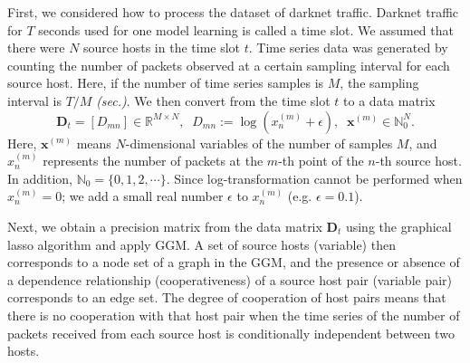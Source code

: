 \documentclass[conference]{IEEEtran}
\begin{document}
First, we considered how to process the dataset of darknet traffic.
Darknet traffic for $T$ seconds used for one model learning is called a time slot.
We assumed that there were $N$ source hosts in the time slot $t$.
Time series data was generated by counting the number of packets observed at a certain sampling interval for each source host.
Here, if the number of time series samples is $M$, the sampling interval is $T/M$ {\it (sec.)}.
We then convert from the time slot $t$ to a data matrix
\begin{equation*}
\bm{D}_t=[D_{mn}]\in\mathbb{R}^{M \times N},
\;\;D_{mn} := \log(x_n^{(m)}+\epsilon),
\;\;\bm{x}^{(m)}\in\mathbb{N}_0^{N}.
\end{equation*}
Here, $\bm{x}^{(m)}$ means $N$-dimensional variables of the number of samples $M$, and $x_n^{(m)}$ represents the number of packets at the $m$-th point of the $n$-th source host.
In addition, $\mathbb{N}_0=\{0,1,2,\cdots\}$.
Since log-transformation cannot be performed when $x_n^{(m)}=0$; we add a small real number $\epsilon$ to $x_n^{(m)}$ (e.g. $\epsilon=0.1$).

Next, we obtain a precision matrix from the data matrix $\bm{D}_t$ using the graphical lasso algorithm and apply GGM.
A set of source hosts (variable) then corresponds to a node set of a graph in the GGM, and the presence or absence of a dependence relationship (cooperativeness) of a source host pair (variable pair) corresponds to an edge set.
The degree of cooperation of host pairs means that there is no cooperation with that host pair when the time series of the number of packets received from each source host is conditionally independent between two hosts.
\end{document}
